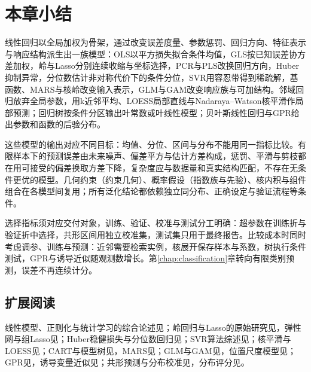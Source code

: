 \section{本章小结}
\label{sec:regression-summary}

线性回归以全局加权为骨架，通过改变误差度量、参数惩罚、回归方向、特征表示与响应结构派生出一族模型：OLS以平方损失拟合条件均值，GLS按已知误差协方差加权，岭与Lasso分别连续收缩与坐标选择，PCR与PLS改换回归方向，Huber抑制异常，分位数估计非对称代价下的条件分位，SVR用容忍带得到稀疏解，基函数、MARS与核岭改变输入表示，GLM与GAM改变响应族与可加结构。邻域回归放弃全局参数，用k近邻平均、LOESS局部直线与Nadaraya--Watson核平滑作局部预测；回归树按条件分区输出叶常数或叶线性模型；贝叶斯线性回归与GPR给出参数和函数的后验分布。

这些模型的输出对应不同目标：均值、分位、区间与分布不能用同一指标比较。有限样本下的预测误差由未来噪声、偏差平方与估计方差构成，惩罚、平滑与剪枝都在用可接受的偏差换取方差下降，复杂度应与数据量和真实结构匹配，不存在无条件更优的模型。几何约束（约束几何）、概率假设（指数族与先验）、核内积与组件组合在各模型间复用；所有泛化结论都依赖独立同分布、正确设定与验证流程等条件。

选择指标须对应交付对象，训练、验证、校准与测试分工明确：超参数在训练折与验证折中选择，共形区间用独立校准集，测试集只用于最终报告。比较成本时同时考虑调参、训练与预测：近邻需要检索实例，核展开保存样本与系数，树执行条件测试，GPR与诱导近似随观测数增长。第\ref{chap:classification}章转向有限类别预测，误差不再连续计分。

\subsection*{扩展阅读}

线性模型、正则化与统计学习的综合论述见；岭回归与Lasso的原始研究见，弹性网与组Lasso见；Huber稳健损失与分位数回归见；SVR算法综述见；核平滑与LOESS见；CART与模型树见，MARS见；GLM与GAM见，位置尺度模型见；GPR见，诱导变量近似见；共形预测与分布校准见，分布评分见。
